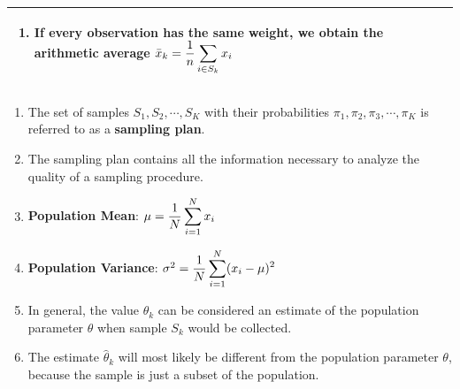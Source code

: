 \begin{customArrayStretch}{1.3}
\begin{longtable}{>{\RaggedRight\arraybackslash}p{4cm} >{\centering\arraybackslash}p{0.5cm} p{10.5cm}}
\begin{minipage}{10.3cm}
\begin{enumerate}
            \item If every observation has the same weight, we obtain the arithmetic average $\bar{x}_k = \dfrac{1}{n} \displaystyle\sum_{i \in S_k} x_i$
            \hfill \cite{statistics/book/Statistics-for-Data-Scientists/Maurits-Kaptein}

        \end{enumerate}
        \vspace{0.15cm}
    \end{minipage}
    \\ \hline


\end{longtable}
\end{customArrayStretch}


\begin{enumerate}
    \item The set of samples $S_1, S_2,\cdots, S_K$ with their probabilities $\pi_1, \pi_2, \pi_3,\cdots,\pi_K$ is referred to as a \textbf{sampling plan}.
    \hfill \cite{statistics/book/Statistics-for-Data-Scientists/Maurits-Kaptein}

    \item The sampling plan contains all the information necessary to analyze the quality of a sampling procedure.
    \hfill \cite{statistics/book/Statistics-for-Data-Scientists/Maurits-Kaptein}

    \item \textbf{Population Mean}: \hspace{2cm} $
        \mu
        = \dfrac{1}{N}\displaystyle\sum_{i=1}^N x_i
    $
    \hfill \cite{statistics/book/Statistics-for-Data-Scientists/Maurits-Kaptein}

    \item \textbf{Population Variance}: \hspace{2cm} $
        \sigma^2
        = \dfrac{1}{N}\displaystyle\sum_{i=1}^N (x_i - \mu)^2
    $
    \hfill \cite{statistics/book/Statistics-for-Data-Scientists/Maurits-Kaptein}

    \item In general, the value $\hat{\theta}_k$ can be considered an estimate of the population parameter $\theta$ when sample $S_k$ would be collected.
    \hfill \cite{statistics/book/Statistics-for-Data-Scientists/Maurits-Kaptein}

    \item The estimate $\hat{\theta}_k$ will most likely be different from the population parameter $\theta$, because the sample is just a subset of the population.
    \hfill \cite{statistics/book/Statistics-for-Data-Scientists/Maurits-Kaptein}


\end{enumerate}
















